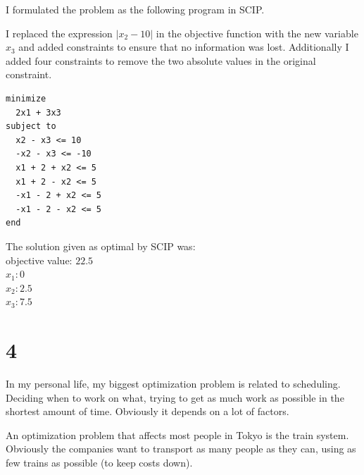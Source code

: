 \documentclass[12pt]{report}
\begin{document}
I formulated the problem as the following program in SCIP.

I replaced the expression $|x_2-10|$ in the objective function with the new variable $x_3$ and added constraints to ensure that no information was lost. Additionally I added four constraints to remove the two absolute values in the original constraint.

\begin{verbatim}
minimize
  2x1 + 3x3
subject to
  x2 - x3 <= 10 
  -x2 - x3 <= -10
  x1 + 2 + x2 <= 5
  x1 + 2 - x2 <= 5
  -x1 - 2 + x2 <= 5
  -x1 - 2 - x2 <= 5
end
\end{verbatim}

The solution given as optimal by SCIP was: \\
objective value: $22.5$\\
$x_1: 0$ \\
$x_2: 2.5$ \\
$x_3: 7.5$ \\



\section*{4}
In my personal life, my biggest optimization problem is related to scheduling. Deciding when to work on what, trying to get as much work as possible in the shortest amount of time. Obviously it depends on a lot of factors.

An optimization problem that affects most people in Tokyo is the train system. Obviously the companies want to transport as many people as they can, using as few trains as possible (to keep costs down).
\end{document}
